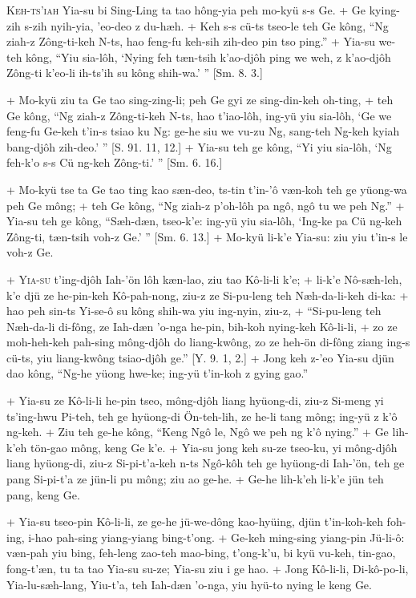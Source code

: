 \header
\lettrine{K}{eh-ts'iah} Yia-su bi Sing-Ling ta tao hông-yia peh mo-kyü s-s Ge.
+	Ge kying-zih s-zih nyih-yia, 'eo-deo z du-hæh.
+	Keh s-s cü-ts tseo-le teh Ge kông, ``Ng ziah-z Zông-ti-keh N-ts, hao feng-fu keh-sih zih-deo pin tso ping.''
+	Yia-su we-teh kông, ``Yiu sia-lôh, `Nying feh tæn-tsih k'ao-djôh ping we weh, z k'ao-djôh Zông-ti k'eo-li ih-ts'ih su kông shih-wa.' '' [Sm. 8. 3.]
\par
+	Mo-kyü ziu ta Ge tao sing-zing-li; peh Ge gyi ze sing-din-keh oh-ting,
+	teh Ge kông, ``Ng ziah-z Zông-ti-keh N-ts, hao t'iao-lôh, ing-yü yiu sia-lôh, `Ge we feng-fu Ge-keh t'in-s tsiao ku Ng: ge-he siu we vu-zu Ng, sang-teh Ng-keh kyiah bang-djôh zih-deo.' '' [S. 91. 11, 12.]
+	Yia-su teh ge kông, ``Yi yiu sia-lôh, `Ng feh-k'o s-s Cü ng-keh Zông-ti.' '' [Sm. 6. 16.]
\par
+	Mo-kyü tse ta Ge tao ting kao sæn-deo, ts-tin t'in-'ô væn-koh teh ge yüong-wa peh Ge mông;
+	teh Ge kông, ``Ng ziah-z p'oh-lôh pa ngô, ngô tu we peh Ng.''
+	Yia-su teh ge kông, ``Sæh-dæn, tseo-k'e: ing-yü yiu sia-lôh, `Ing-ke pa Cü ng-keh Zông-ti, tæn-tsih voh-z Ge.' '' [Sm. 6. 13.]
+	Mo-kyü li-k'e Yia-su: ziu yiu t'in-s le voh-z Ge.
\par
+	\textsc{Yia-su} t'ing-djôh Iah-'ön lôh kæn-lao, ziu tao Kô-li-li k'e;
+	li-k'e Nô-sæh-leh, k'e djü ze he-pin-keh Kô-pah-nong, ziu-z ze Si-pu-leng teh Næh-da-li-keh di-ka:
+	hao peh sin-ts Yi-se-ô su kông shih-wa yiu ing-nyin, ziu-z,
+	``Si-pu-leng teh Næh-da-li di-fông, ze Iah-dæn 'o-nga he-pin, bih-koh nying-keh Kô-li-li,
+	zo ze moh-heh-keh pah-sing mông-djôh do liang-kwông, zo ze heh-ön di-fông ziang ing-s cü-ts, yiu liang-kwông tsiao-djôh ge.'' [Y. 9. 1, 2.]
+	Jong keh z-'eo Yia-su djün dao kông, ``Ng-he yüong hwe-ke; ing-yü t'in-koh z gying gao.''
\par
+	Yia-su ze Kô-li-li he-pin tseo, mông-djôh liang hyüong-di, ziu-z Si-meng yi ts'ing-hwu Pi-teh, teh ge hyüong-di Ön-teh-lih, ze he-li tang mông; ing-yü z k'ô ng-keh.
+	Ziu teh ge-he kông, ``Keng Ngô le, Ngô we peh ng k'ô nying.''
+	Ge lih-k'eh tön-gao mông, keng Ge k'e.
+	Yia-su jong keh su-ze tseo-ku, yi mông-djôh liang hyüong-di, ziu-z Si-pi-t'a-keh n-ts Ngô-kôh teh ge hyüong-di Iah-'ön, teh ge pang Si-pi-t'a ze jün-li pu mông; ziu ao ge-he.
+	Ge-he lih-k'eh li-k'e jün teh pang, keng Ge.
\par
+	Yia-su tseo-pin Kô-li-li, ze ge-he jü-we-dông kao-hyüing, djün t'in-koh-keh foh-ing, i-hao pah-sing yiang-yiang bing-t'ong.
+	Ge-keh ming-sing yiang-pin Jü-li-ô: væn-pah yiu bing, feh-leng zao-teh mao-bing, t'ong-k'u, bi kyü vu-keh, tin-gao, fong-t'æn, tu ta tao Yia-su su-ze; Yia-su ziu i ge hao.
+	Jong Kô-li-li, Di-kô-po-li, Yia-lu-sæh-lang, Yiu-t'a, teh Iah-dæn 'o-nga, yiu hyü-to nying le keng Ge.



